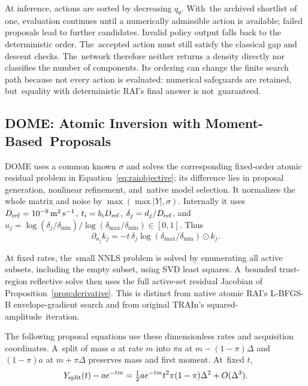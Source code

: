 \documentclass[mathematics,article,accept,moreauthors]{Definitions/mdpi}
\begin{document}
At inference, actions are sorted by decreasing $q_\theta$. With~the archived shortlist of one, evaluation continues until a numerically admissible action is available; failed proposals lead to further candidates. Invalid policy output falls back to the deterministic order. The~accepted action must still satisfy the classical gap and descent checks. The~network therefore neither returns a density directly nor classifies the number of components. Its ordering can change the finite search path because not every action is evaluated: numerical safeguards are retained, but~equality with deterministic RAI's final answer is not~guaranteed.

\subsection{DOME: Atomic Inversion with Moment-Based~Proposals}\label{sec:domemath}
DOME uses a common known $\sigma$ and solves the corresponding fixed-order atomic residual problem in Equation~\eqref{eq:raiobjective}; its difference lies in proposal generation, nonlinear refinement, and~native model selection. It normalizes the whole matrix and noise by $\max(\max|Y|,\sigma)$. Internally it uses $D_{\rm ref}=10^{-9}\,\mathrm{m^2\,s^{-1}}$, $t_i=b_iD_{\rm ref}$, $\delta_j=d_j/D_{\rm ref}$, and\linebreak  $u_j=\log(\delta_j/\delta_{\min})/\log(\delta_{\max}/\delta_{\min})\in[0,1]$. Thus
\begin{equation}\label{eq:domegradient}
 \partial_{u_j}k_j=-t\,\delta_j\log(\delta_{\max}/\delta_{\min})\odot k_j.
\end{equation}

At fixed rates, the~small NNLS problem is solved by enumerating all active subsets, including the empty subset, using SVD least squares. A~bounded trust-region reflective solve then uses the full active-set residual Jacobian of Proposition~\ref{prop:derivative}. This is distinct from native atomic RAI's L-BFGS-B envelope-gradient search and from original TRAIn's squared-amplitude~iteration.

The following proposal equations use these dimensionless rates and acquisition coordinates. A~split of mass $a$ at rate $m$ into $\pi a$ at $m-(1-\pi)\Delta$ and $(1-\pi)a$ at $m+\pi\Delta$ preserves mass and first moment. At~fixed $t$,
\begin{equation}\label{eq:split}
 Y_{\rm split}(t)-ae^{-tm}
 =\tfrac12 ae^{-tm}t^2\pi(1-\pi)\Delta^2+O(\Delta^3).
\end{equation}
\end{document}
